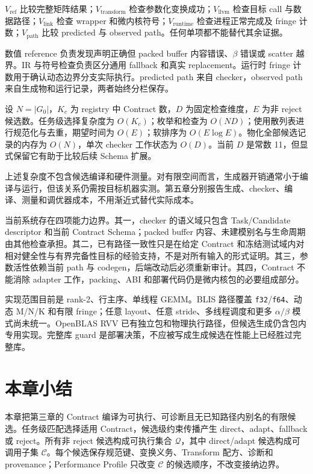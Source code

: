 $V_{\mathrm{ref}}$ 比较完整矩阵结果；$V_{\mathrm{transform}}$ 检查参数化变换成功；$V_{\mathrm{llvm}}$ 检查目标 call 与数据路径；$V_{\mathrm{link}}$ 检查 wrapper 和微内核符号；$V_{\mathrm{runtime}}$ 检查进程正常完成及 fringe 计数；$V_{\mathrm{path}}$ 比较 predicted 与 observed path。任何单项都不能替代其余证据。

数值 reference 负责发现声明正确但 packed buffer 内容错误、$\beta$ 错误或 scatter 越界。IR 与符号检查负责区分通用 fallback 和真实 replacement。运行时 fringe 计数用于确认动态边界分支实际执行。predicted path 来自 checker，observed path 来自生成物和运行记录，两者始终分栏保存。

设 $N=|G_0|$，$K_c$ 为 registry 中 Contract 数，$D$ 为固定检查维度，$E$ 为非 reject 候选数。任务级选择复杂度为 $O(K_c)$；枚举和检查为 $O(ND)$；使用散列表进行规范化与去重，期望时间为 $O(E)$；软排序为 $O(E\log E)$。物化全部候选记录的内存为 $O(N)$，单次 checker 工作状态为 $O(D)$。当前 $D$ 是常数 11，但显式保留它有助于比较后续 Schema 扩展。

上述复杂度不包含候选编译和硬件测量。对有限空间而言，生成器开销通常小于编译与运行，但该关系仍需按目标机器实测。第五章分别报告生成、checker、编译、测量和调优器成本，不用渐近式替代实际成本。

当前系统存在四项能力边界。其一，checker 的语义域只包含 Task/Candidate descriptor 和当前 Contract Schema；packed buffer 内容、未建模别名与生命周期由其他检查承担。其二，已有路径一致性只是在给定 Contract 和冻结测试域内对相对健全性与有界完备性目标的经验支持，不是对所有输入的形式证明。其三，参数活性依赖当前 path 与 codegen，后端改动后必须重新审计。其四，Contract 不能消除 adapter 工作，packing、ABI 和部署代码仍是微内核包的必要组成部分。

实现范围目前是 rank-2、行主序、单线程 GEMM。BLIS 路径覆盖 \texttt{f32}/\texttt{f64}、动态 M/N/K 和有限 fringe；任意 layout、任意 stride、多线程调度和更多 $\alpha/\beta$ 模式尚未统一。OpenBLAS RVV 已有独立包和物理执行路径，但候选生成仍含包内专用实现。完整库 guard 是部署决策，不应被写成生成候选在性能上已经胜过完整库。

\section{本章小结}

本章把第三章的 Contract 编译为可执行、可诊断且无已知路径内别名的有限候选。任务级匹配选择适用 Contract，候选级约束传播产生 direct、adapt、fallback 或 reject。所有非 reject 候选构成可执行集合 $\mathcal{Q}$，其中 direct/adapt 候选构成可调用子集 $\mathcal{C}$。每个候选保存规范键、变换义务、Transform 配方、诊断和 provenance；Performance Profile 只改变 $\mathcal{C}$ 的候选顺序，不改变接纳边界。

